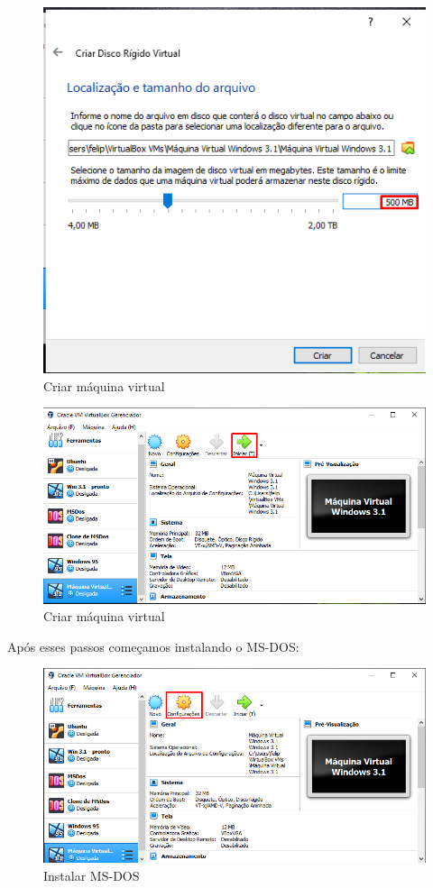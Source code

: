 \documentclass{report}
\begin{document}
\begin{figure}
\centering
\includegraphics[width=\textwidth]{Screenshot_7.png}
\caption{Criar máquina virtual}
\label{fig:7}
\end{figure}
\newpage
\begin{figure}
\centering
\includegraphics[width=\textwidth]{Screenshot_8.png}
\caption{Criar máquina virtual}
\label{fig:8}
\end{figure}

Após esses passos começamos instalando o MS-DOS:

\begin{figure}
\centering
\includegraphics[width=\textwidth]{Screenshot_9.png}
\caption{Instalar MS-DOS}
\label{fig:9}
\end{figure}
\end{document}
